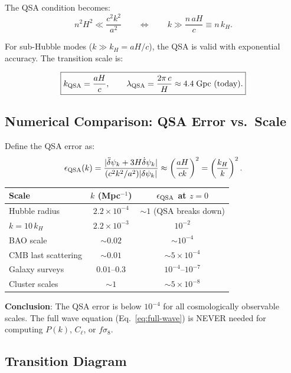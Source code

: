 \documentclass[11pt]{article}
\theoremstyle{definition}
\theoremstyle{remark}
\newcommand{\ee}[1]{\times 10^{#1}}
\newcommand{\dpsi}{\delta\psi}
\begin{document}
The QSA condition becomes:
\begin{equation}
n^2 H^2 \ll \frac{c^2 k^2}{a^2}
\qquad\Longleftrightarrow\qquad
k \gg \frac{n\,aH}{c} \equiv n\,k_H.
\label{eq:qsa-condition}
\end{equation}

For sub-Hubble modes ($k \gg k_H = aH/c$), the QSA is valid
with exponential accuracy. The transition scale is:

\begin{equation}
\boxed{
k_{\rm QSA} = \frac{aH}{c}, \qquad
\lambda_{\rm QSA} = \frac{2\pi\,c}{H} \approx 4.4\;\text{Gpc (today)}.
}
\label{eq:kQSA}
\end{equation}

\subsection{Numerical Comparison: QSA Error vs.\ Scale}

Define the QSA error as:
\begin{equation}
\epsilon_{\rm QSA}(k) = \frac{|\ddot\dpsi_k + 3H\dot\dpsi_k|}{(c^2k^2/a^2)|\dpsi_k|}
\approx \left(\frac{aH}{ck}\right)^2 = \left(\frac{k_H}{k}\right)^2.
\end{equation}

\begin{center}
\begin{tabular}{lcc}
\toprule
Scale & $k$ (Mpc$^{-1}$) & $\epsilon_{\rm QSA}$ at $z=0$ \\
\midrule
Hubble radius & $2.2 \ee{-4}$ & $\sim 1$ (QSA breaks down) \\
$k = 10\,k_H$ & $2.2 \ee{-3}$ & $10^{-2}$ \\
BAO scale & $\sim 0.02$ & $\sim 10^{-4}$ \\
CMB last scattering & $\sim 0.01$ & $\sim 5 \ee{-4}$ \\
Galaxy surveys & $0.01$--$0.3$ & $10^{-4}$--$10^{-7}$ \\
Cluster scales & $\sim 1$ & $\sim 5 \ee{-8}$ \\
\bottomrule
\end{tabular}
\end{center}

\textbf{Conclusion}: The QSA error is below $10^{-4}$ for all
cosmologically observable scales. The full wave equation
(Eq.~\ref{eq:full-wave}) is NEVER needed for computing
$P(k)$, $C_\ell$, or $f\sigma_8$.

\subsection{Transition Diagram}
\end{document}
